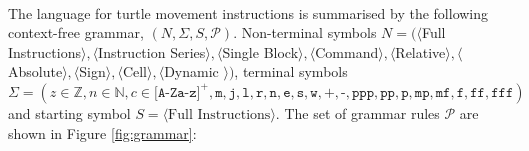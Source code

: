 \paragraph{} The language for turtle movement instructions is summarised by the following context-free grammar, $(N,\Sigma,S,\mathcal{P})$. Non-terminal symbols $N=(\langle$Full Instructions$\rangle, \langle$Instruction Series$\rangle, \langle$Single Block$\rangle, \langle$Command$\rangle, \langle$Relative$\rangle, \langle$Absolute$\rangle, \langle$Sign$\rangle, \langle$Cell$\rangle, \langle$Dynamic $\rangle)$, terminal symbols $\Sigma=(z{\in}\mathbb{Z}, n{\in}\mathbb{N}, c{\in}\texttt{[A-Za-z]}^{+}, \texttt{m}, \texttt{j}, \texttt{l}, \texttt{r}, \texttt{n}, \texttt{e}, \texttt{s}, \texttt{w}, \texttt{+}, \texttt{-}, \texttt{ppp}, \texttt{pp}, \texttt{p}, \texttt{mp}, \texttt{mf}, \texttt{f}, \texttt{ff}, \texttt{fff})$ and starting symbol $S = \langle \text{Full Instructions} \rangle$. The set of grammar rules $\mathcal{P}$ are shown in Figure \ref{fig:grammar}:


